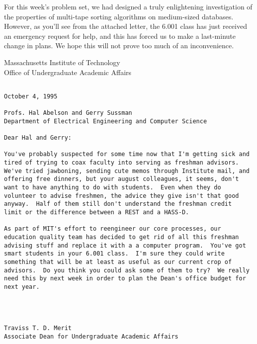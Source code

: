 % 





\medskip

For this week's problem set, we had designed a truly enlightening
investigation of the properties of multi-tape sorting algorithms on
medium-sized databases.  However, as you'll see from the attached
letter, the 6.001 class has just received an emergency request for
help, and this has forced us to make a last-minute change in plans.
We hope this will not prove too much of an inconvenience.

\pagebreak

\hspace*{1in}

\begin{center}
{\sc Massachusetts Institute of Technology \\
Office of Undergraduate Academic Affairs}
\end{center}

\bigskip

\begin{verbatim}

October 4, 1995

Profs. Hal Abelson and Gerry Sussman
Department of Electrical Engineering and Computer Science

Dear Hal and Gerry:

You've probably suspected for some time now that I'm getting sick and
tired of trying to coax faculty into serving as freshman advisors.
We've tried jawboning, sending cute memos through Institute mail, and
offering free dinners, but your august colleagues, it seems, don't
want to have anything to do with students.  Even when they do
volunteer to advise freshmen, the advice they give isn't that good
anyway.  Half of them still don't understand the freshman credit
limit or the difference between a REST and a HASS-D.

As part of MIT's effort to reengineer our core processes, our
education quality team has decided to get rid of all this freshman
advising stuff and replace it with a a computer program.  You've got
smart students in your 6.001 class.  I'm sure they could write
something that will be at least as useful as our current crop of
advisors.  Do you think you could ask some of them to try?  We really
need this by next week in order to plan the Dean's office budget for
next year.




Traviss T. D. Merit
Associate Dean for Undergraduate Academic Affairs

\end{verbatim}

